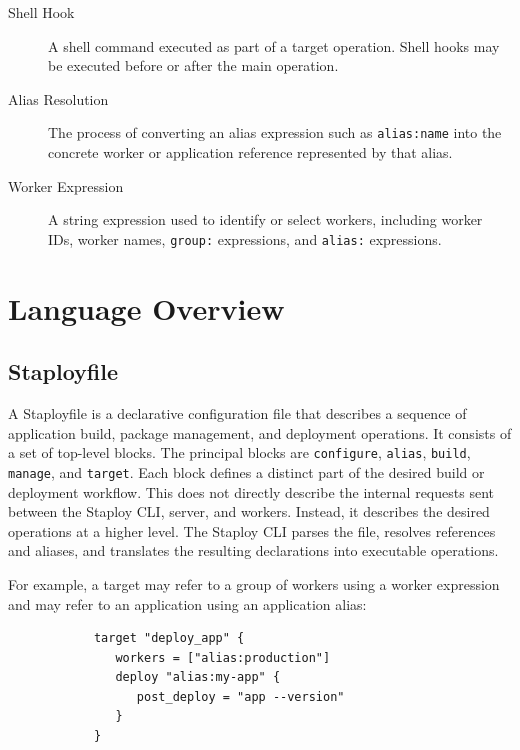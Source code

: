 \documentclass[11pt,a4paper]{article}
\begin{document}
\begin{description}
        \item[Shell Hook]
        A shell command executed as part of a target operation.
        Shell hooks may be executed before or after the main operation.

        \item[Alias Resolution]
        The process of converting an alias expression such as
        \texttt{alias:name} into the concrete worker or application reference
        represented by that alias.

        \item[Worker Expression]
        A string expression used to identify or select workers, including
        worker IDs, worker names, \texttt{group:} expressions, and
        \texttt{alias:} expressions.
    \end{description}


    \section{Language Overview}\label{sec:language-overview}

    \subsection{Staployfile}\label{subsec:staployfile}

    A Staployfile is a declarative configuration file that describes a
    sequence of application build, package management, and deployment operations.
    It consists of a set of top-level blocks.
    The principal blocks are \texttt{configure}, \texttt{alias}, \texttt{build}, \texttt{manage}, and \texttt{target}.
    Each block defines a distinct part of the desired build or deployment workflow.
    This does not directly describe the internal requests sent
    between the Staploy CLI, server, and workers.
    Instead, it describes the desired operations at a higher level.
    The Staploy CLI parses the file, resolves references and aliases, and translates the resulting
    declarations into executable operations.

    For example, a target may refer to a group of workers using a worker
    expression and may refer to an application using an application alias:

    \begin{center}
        \begin{verbatim}
            target "deploy_app" {
               workers = ["alias:production"]
               deploy "alias:my-app" {
                  post_deploy = "app --version"
               }
            }
        \end{verbatim}
    \end{center}
\end{document}
